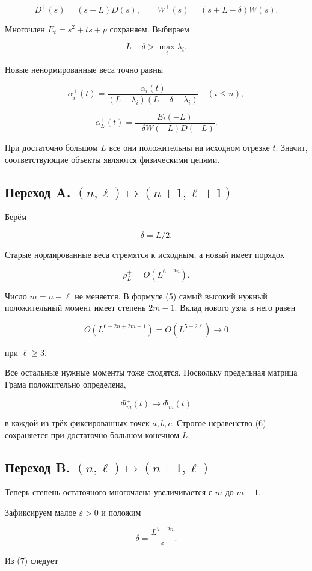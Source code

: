 \documentclass[11pt,a4paper]{article}
\begin{document}
\[
D^+(s)=(s+L)D(s),\qquad
W^+(s)=(s+L-\delta)W(s).
\]

Многочлен \(E_t=s^2+ts+p\) сохраняем. Выбираем

\[
L-\delta>\max_i\lambda_i.
\]

Новые ненормированные веса точно равны

\[
\alpha_i^+(t)=
\frac{\alpha_i(t)}
{(L-\lambda_i)(L-\delta-\lambda_i)}
\quad (i\le n),
\]

\[
\alpha_L^+(t)=
\frac{E_t(-L)}{-\delta W(-L)D(-L)}.
\tag{7}
\]

При достаточно большом \(L\) все они положительны на исходном отрезке \(t\). Значит, соответствующие объекты являются физическими цепями.

\subsection*{Переход A. \((n,\ell)\longmapsto(n+1,\ell+1)\)}

Берём

\[
\delta=L/2.
\]

Старые нормированные веса стремятся к исходным, а новый имеет порядок

\[
\rho_L^+=O(L^{6-2n}).
\]

Число \(m=n-\ell\) не меняется. В формуле (5) самый высокий нужный положительный момент имеет степень \(2m-1\). Вклад нового узла в него равен

\[
O(L^{6-2n+2m-1})
=
O(L^{5-2\ell})\longrightarrow0
\]

при \(\ell\ge3\).

Все остальные нужные моменты тоже сходятся. Поскольку предельная матрица Грама положительно определена,

\[
\Phi_m^+(t)\longrightarrow\Phi_m(t)
\]

в каждой из трёх фиксированных точек \(a,b,c\). Строгое неравенство (6) сохраняется при достаточно большом конечном \(L\).

\subsection*{Переход B. \((n,\ell)\longmapsto(n+1,\ell)\)}

Теперь степень остаточного многочлена увеличивается с \(m\) до \(m+1\).

Зафиксируем малое \(\varepsilon>0\) и положим

\[
\delta=\frac{L^{7-2n}}{\varepsilon}.
\]

Из (7) следует
\end{document}
